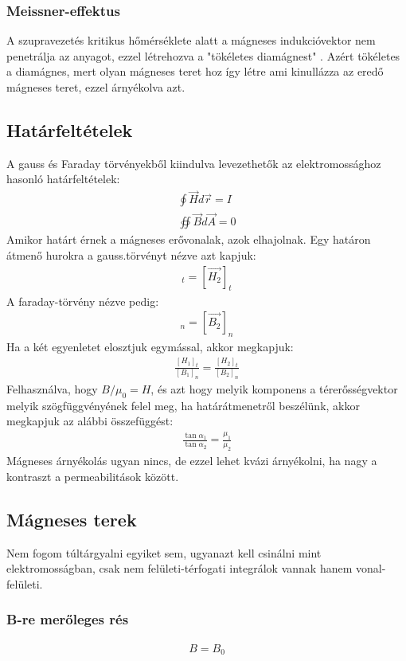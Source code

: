 \documentclass{article}
\begin{document}
\subsubsection{Meissner-effektus}
A szupravezetés kritikus hőmérséklete alatt a mágneses indukcióvektor nem penetrálja az anyagot, ezzel létrehozva a "tökéletes diamágnest" . Azért tökéletes a diamágnes, mert olyan mágneses teret hoz így létre ami kinullázza az eredő mágneses teret, ezzel árnyékolva azt.
\subsection{Határfeltételek}
A gauss és Faraday törvényekből kiindulva levezethetők az elektromossághoz hasonló határfeltételek: 
\begin{gather*}
\oint \vec{H} d\vec{r} = I \\
\oiint \vec{B} d\vec{A} = 0
\end{gather*}
Amikor határt érnek a mágneses erővonalak, azok elhajolnak. Egy határon átmenő hurokra a gauss.törvényt nézve azt kapjuk:
\begin{gather*}
[\vec{H_1}]_t = [\vec{H_2}]_t 
\end{gather*}
A faraday-törvény nézve pedig:
\begin{gather*}
[\vec{B_1}]_n = [\vec{B_2}]_n
\end{gather*}
Ha a két egyenletet elosztjuk egymással, akkor megkapjuk:
\begin{gather*}
\frac{[H_1]_t}{[B_1]_n} = \frac{[H_2]_t}{[B_2]_n}
\end{gather*}
Felhasználva, hogy $B/\mu_0 = H$, és azt hogy melyik komponens a térerősségvektor melyik szögfüggvényének felel meg, ha határátmenetről beszélünk, akkor megkapjuk az alábbi összefüggést:
\begin{gather*}
\frac{\tan \alpha_1}{\tan \alpha_2} = \frac{\mu_1}{\mu_2}
\end{gather*}
Mágneses árnyékolás ugyan nincs, de ezzel lehet kvázi árnyékolni, ha nagy a kontraszt a permeabilitások között.
\subsection{Mágneses terek}
Nem fogom túltárgyalni egyiket sem, ugyanazt kell csinálni mint elektromosságban, csak nem felületi-térfogati integrálok vannak hanem vonal-felületi.
\subsubsection{B-re merőleges rés}
\begin{gather*}
B=B_0
\end{gather*}
\end{document}
